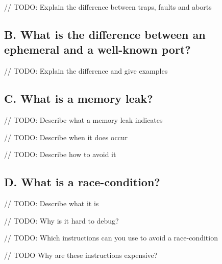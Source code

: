\documentclass[11pt]{article}
\begin{document}
// TODO: Explain the difference between traps, faults and aborts

\subsection{B. What is the difference between an ephemeral and a well-known port?}

// TODO: Explain the difference and give examples

\subsection{C. What is a memory leak?}
// TODO: Describe what a memory leak indicates

// TODO: Describe when it does occur

// TODO: Describe how to avoid it

\subsection{D. What is a race-condition?}

// TODO: Describe what it is

// TODO: Why is it hard to debug?

// TODO: Which instructions can you use to avoid a race-condition

// TODO Why are these instructions expensive?
\end{document}
